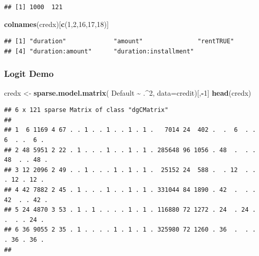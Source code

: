 \documentclass[
  shownotes,
  xcolor={svgnames},
  hyperref={colorlinks,citecolor=DarkBlue,linkcolor=DarkRed,urlcolor=DarkBlue}
  , aspectratio=169]{beamer}
\newenvironment{Shaded}{\begin{snugshade}}{\end{snugshade}}
\newcommand{\DataTypeTok}[1]{\textcolor[rgb]{0.13,0.29,0.53}{#1}}
\newcommand{\DecValTok}[1]{\textcolor[rgb]{0.00,0.00,0.81}{#1}}
\newcommand{\KeywordTok}[1]{\textcolor[rgb]{0.13,0.29,0.53}{\textbf{#1}}}
\newcommand{\NormalTok}[1]{#1}
\newcommand{\OperatorTok}[1]{\textcolor[rgb]{0.81,0.36,0.00}{\textbf{#1}}}
\newcommand{\StringTok}[1]{\textcolor[rgb]{0.31,0.60,0.02}{#1}}
\begin{document}
\begin{frame}[fragile]
\begin{tiny}
\begin{verbatim}
## [1] 1000  121
\end{verbatim}
\end{tiny}

\begin{scriptsize}
\begin{Shaded}
\begin{Highlighting}[]
\KeywordTok{colnames}\NormalTok{(credx)[}\KeywordTok{c}\NormalTok{(}\DecValTok{1}\NormalTok{,}\DecValTok{2}\NormalTok{,}\DecValTok{16}\NormalTok{,}\DecValTok{17}\NormalTok{,}\DecValTok{18}\NormalTok{)]}
\end{Highlighting}
\end{Shaded}
\end{scriptsize}

\begin{tiny}
\begin{verbatim}
## [1] "duration"             "amount"               "rentTRUE"            
## [4] "duration:amount"      "duration:installment"
\end{verbatim}
\end{tiny}
\end{frame}
\begin{frame}[fragile]
\frametitle{Logit Demo}

\begin{scriptsize}
\begin{Shaded}
\begin{Highlighting}[]
\NormalTok{credx \textless{}{-}}\StringTok{ }\KeywordTok{sparse.model.matrix}\NormalTok{( Default }\OperatorTok{\textasciitilde{}}\StringTok{ }\NormalTok{.}\OperatorTok{\^{}}\DecValTok{2}\NormalTok{, }\DataTypeTok{data=}\NormalTok{credit)[,}\OperatorTok{{-}}\DecValTok{1}\NormalTok{]}
\KeywordTok{head}\NormalTok{(credx)}
\end{Highlighting}
\end{Shaded}
\end{scriptsize}

\begin{tiny}
\begin{verbatim}
## 6 x 121 sparse Matrix of class "dgCMatrix"
##                                                                                
## 1  6 1169 4 67 . . 1 . . 1 . . 1 . 1 .   7014 24  402 .  .  6  . .  6  . .  6 .
## 2 48 5951 2 22 . 1 . . . 1 . . 1 . 1 . 285648 96 1056 . 48  .  . . 48  . . 48 .
## 3 12 2096 2 49 . . 1 . . . 1 . 1 . 1 .  25152 24  588 .  . 12  . .  . 12 . 12 .
## 4 42 7882 2 45 . 1 . . . 1 . . 1 . 1 . 331044 84 1890 . 42  .  . . 42  . . 42 .
## 5 24 4870 3 53 . 1 . 1 . . . . 1 . 1 . 116880 72 1272 . 24  . 24 .  .  . . 24 .
## 6 36 9055 2 35 . 1 . . . . 1 . 1 . 1 . 325980 72 1260 . 36  .  . .  . 36 . 36 .
##                                                                               

\end{verbatim}
\end{tiny}

\end{frame}
\end{document}
